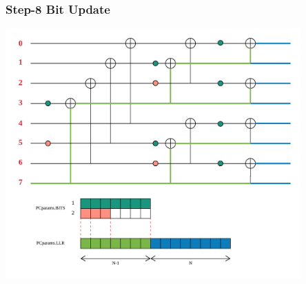 \documentclass{beamer}
\begin{document}
\begin{frame}
\frametitle{Step-8 Bit Update}
  \begin{center}
  \includegraphics[width=0.85\textwidth]{pics/polar_-_SC_bit_8.png}
  \end{center}
\end{frame}
\end{document}
